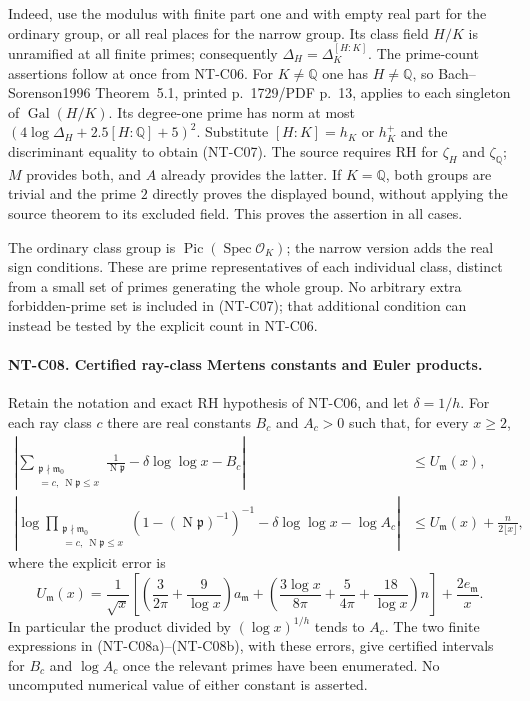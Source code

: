 \documentclass[11pt,a4paper]{article}
\begin{document}
Indeed, use the modulus with finite part one and with empty real
part for the ordinary group, or all real places for the narrow
group.  Its class field $H/K$ is unramified at all finite primes;
consequently $\Delta_H=\Delta_K^{[H:K]}$.
The prime-count assertions follow at once from NT-C06.
For $K\ne\mathbb Q$ one has $H\ne\mathbb Q$, so
Bach--Sorenson1996 Theorem~5.1, printed p.~1729/PDF p.~13,
applies to each singleton of $\operatorname{Gal}(H/K)$.
Its degree-one prime has norm at most
$(4\log\Delta_H+2.5[H:\mathbb Q]+5)^2$.
Substitute $[H:K]=h_K$ or $h_K^+$ and the discriminant equality
to obtain (NT-C07).  The source requires RH for $\zeta_H$
and $\zeta_{\mathbb Q}$; $M$ provides both, and $A$ already
provides the latter.  If $K=\mathbb Q$, both groups are trivial
and the prime $2$ directly proves the displayed bound, without
applying the source theorem to its excluded field.
This proves the assertion in all cases.

The ordinary class group is
$\operatorname{Pic}(\operatorname{Spec}\mathcal O_K)$; the narrow
version adds the real sign conditions.  These are prime
representatives of each individual class, distinct from a small
set of primes generating the whole group.  No arbitrary extra
forbidden-prime set is included in (NT-C07); that additional
condition can instead be tested by the explicit count in NT-C06.

\paragraph{NT-C08. Certified ray-class Mertens constants and Euler products.}
Retain the notation and exact RH hypothesis of NT-C06, and let
$\delta=1/h$.  For each ray class $c$ there are real constants
$B_c$ and $A_c>0$ such that, for every $x\ge2$,
\begin{align*}
 \left|\sum_{\substack{\mathfrak p\nmid\mathfrak m_0\\
          [\mathfrak p]=c,\ \operatorname N\mathfrak p\le x}}
        \frac1{\operatorname N\mathfrak p}
        -\delta\log\log x-B_c\right|
       &\le U_{\mathfrak m}(x),                       \tag{NT-C08a}\\
 \left|\log\prod_{\substack{\mathfrak p\nmid\mathfrak m_0\\
          [\mathfrak p]=c,\ \operatorname N\mathfrak p\le x}}
       (1-(\operatorname N\mathfrak p)^{-1})^{-1}
       -\delta\log\log x-\log A_c\right|
       &\le U_{\mathfrak m}(x)+\frac{n}{2\lfloor x\rfloor},
                                                        \tag{NT-C08b}
\end{align*}
where the explicit error is
\[
 U_{\mathfrak m}(x)=\frac1{\sqrt x}
 \left[
   \left(\frac3{2\pi}+\frac9{\log x}\right)a_{\mathfrak m}
   +\left(\frac{3\log x}{8\pi}+\frac5{4\pi}
                    +\frac{18}{\log x}\right)n\right]
       +\frac{2e_{\mathfrak m}}x.
\tag{NT-C08-error}
\]
In particular the product divided by $(\log x)^{1/h}$ tends
to $A_c$.  The two finite expressions in (NT-C08a)--(NT-C08b),
with these errors, give certified intervals for $B_c$ and
$\log A_c$ once the relevant primes have been enumerated.
No uncomputed numerical value of either constant is asserted.
\end{document}
